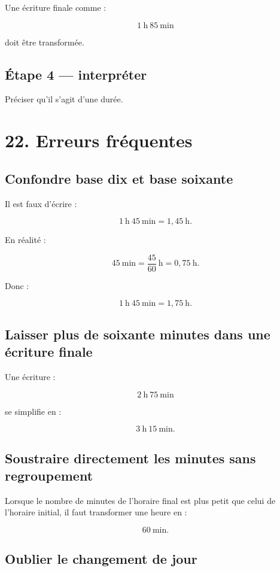 Une écriture finale comme :

\[
1\ \text{h}\ 85\ \text{min}
\]

doit être transformée.

\subsection{Étape 4 — interpréter}

Préciser qu’il s’agit d’une durée.

\section{22. Erreurs fréquentes}

\subsection{Confondre base dix et base soixante}

Il est faux d’écrire :

\[
1\ \text{h}\ 45\ \text{min}
=
1{,}45\ \text{h}.
\]

En réalité :

\[
45\ \text{min}
=
\dfrac{45}{60}\ \text{h}
=
0{,}75\ \text{h}.
\]

Donc :

\[
1\ \text{h}\ 45\ \text{min}
=
1{,}75\ \text{h}.
\]

\subsection{Laisser plus de soixante minutes dans une écriture finale}

Une écriture :

\[
2\ \text{h}\ 75\ \text{min}
\]

se simplifie en :

\[
3\ \text{h}\ 15\ \text{min}.
\]

\subsection{Soustraire directement les minutes sans regroupement}

Lorsque le nombre de minutes de l’horaire final est plus petit que celui de l’horaire initial, il faut transformer une heure en :

\[
60\ \text{min}.
\]

\subsection{Oublier le changement de jour}

